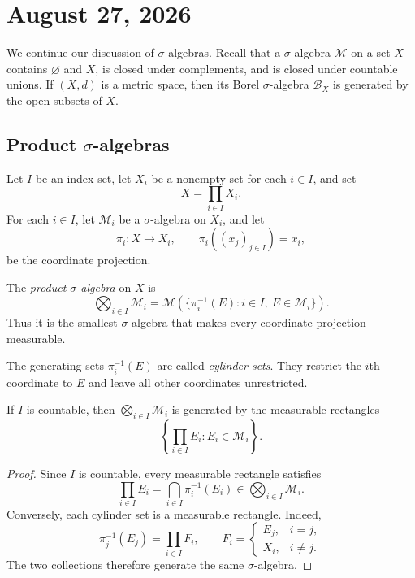 \section{August 27, 2026}

We continue our discussion of $\sigma$-algebras. Recall that a
$\sigma$-algebra $\mathcal M$ on a set $X$ contains $\varnothing$ and
$X$, is closed under complements, and is closed under countable unions.
If $(X,d)$ is a metric space, then its Borel $\sigma$-algebra
$\mathcal B_X$ is generated by the open subsets of $X$.

\subsection{Product \texorpdfstring{$\sigma$}{sigma}-algebras}

Let $I$ be an index set, let $X_i$ be a nonempty set for each $i\in I$,
and set
\[
  X=\prod_{i\in I}X_i.
\]
For each $i\in I$, let $\mathcal M_i$ be a $\sigma$-algebra on $X_i$,
and let
\[
  \pi_i\colon X\longrightarrow X_i,
  \qquad
  \pi_i((x_j)_{j\in I})=x_i,
\]
be the coordinate projection.

\begin{definition}
  The \emph{product $\sigma$-algebra} on $X$ is
  \[
    \bigotimes_{i\in I}\mathcal M_i
    =\mathcal M\left(
      \{\pi_i^{-1}(E):i\in I,\ E\in\mathcal M_i\}
    \right).
  \]
  Thus it is the smallest $\sigma$-algebra that makes every coordinate
  projection measurable.
\end{definition}

The generating sets $\pi_i^{-1}(E)$ are called \emph{cylinder sets}.
They restrict the $i$th coordinate to $E$ and leave all other coordinates
unrestricted.

\begin{lemma}\label{lem:countable-product-rectangles}
  If $I$ is countable, then $\bigotimes_{i\in I}\mathcal M_i$ is
  generated by the measurable rectangles
  \[
    \left\{\prod_{i\in I}E_i:E_i\in\mathcal M_i\right\}.
  \]
\end{lemma}

\begin{proof}
  Since $I$ is countable, every measurable rectangle satisfies
  \[
    \prod_{i\in I}E_i
    =\bigcap_{i\in I}\pi_i^{-1}(E_i)
    \in\bigotimes_{i\in I}\mathcal M_i.
  \]
  Conversely, each cylinder set is a measurable rectangle. Indeed,
  \[
    \pi_j^{-1}(E_j)=\prod_{i\in I}F_i,
    \qquad
    F_i=
    \begin{cases}
      E_j,&i=j,\\
      X_i,&i\neq j.
    \end{cases}
  \]
  The two collections therefore generate the same $\sigma$-algebra.
\end{proof}

